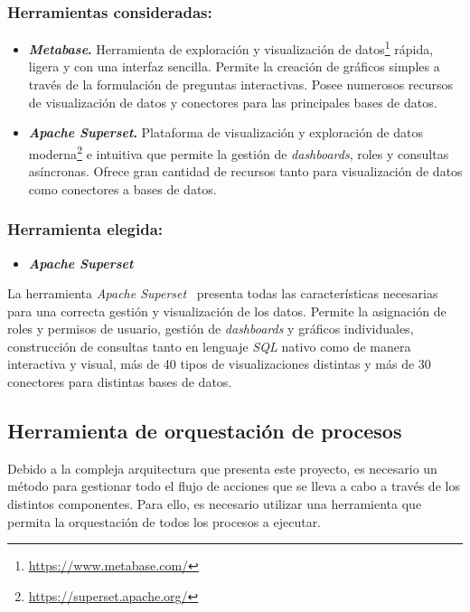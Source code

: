 \subsubsection{Herramientas consideradas:}

\begin{itemize}
    \item \textbf{\textit{Metabase}.} Herramienta de exploración y visualización de datos\footnote{\url{https://www.metabase.com/}} rápida, ligera y con una interfaz sencilla. Permite la creación de gráficos simples a través de la formulación de preguntas interactivas. Posee numerosos recursos de visualización de datos y conectores para las principales bases de datos. 
    
    \item \textbf{\textit{Apache Superset}.} Plataforma de visualización y exploración de datos moderna\footnote{\url{https://superset.apache.org/}} e intuitiva que permite la gestión de \textit{dashboards}, roles y consultas asíncronas. Ofrece gran cantidad de recursos tanto para visualización de datos como conectores a bases de datos.
\end{itemize}

\vspace{2cm}

\subsubsection{Herramienta elegida:}

\begin{itemize}
    \item \textbf{\textit{Apache Superset}}
\end{itemize}

La herramienta \textit{Apache Superset}~\cite{apacheSuperset} presenta todas las características necesarias para una correcta gestión y visualización de los datos. Permite la asignación de roles y permisos de usuario, gestión de \textit{dashboards} y gráficos individuales, construcción de consultas tanto en lenguaje \textit{SQL} nativo como de manera interactiva y visual, más de 40 tipos de visualizaciones distintas y más de 30 conectores para distintas bases de datos.

\subsection{Herramienta de orquestación de procesos}

Debido a la compleja arquitectura que presenta este proyecto, es necesario un método para gestionar todo el flujo de acciones que se lleva a cabo a través de los distintos componentes. Para ello, es necesario utilizar una herramienta que permita la orquestación de todos los procesos a ejecutar.


